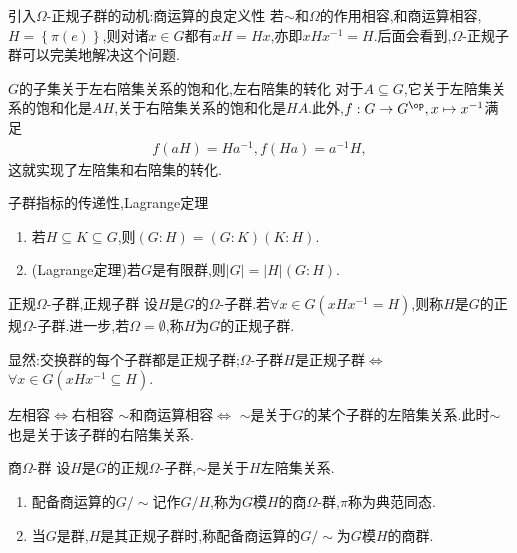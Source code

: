 \begin{remark}{引入$\Omega$-正规子群的动机:商运算的良定义性}{}
	若$\sim$和$\Omega$的作用相容,和商运算相容,$H=\left\{\pi\left(e\right)\right\}$,则对诸$x\in G$都有$xH=Hx$,亦即$xHx^{-1}=H$.后面会看到,$\Omega$-正规子群可以完美地解决这个问题.
\end{remark}

\begin{remark}{$G$的子集关于左右陪集关系的饱和化,左右陪集的转化}{}
	对于$A\subseteq G$,它关于左陪集关系的饱和化是$AH$,关于右陪集关系的饱和化是$HA$.此外,$f:G\to G^{\op},x\mapsto x^{-1}$满足
	\begin{align*}
		f\left(aH\right)=Ha^{-1},f\left(Ha\right)=a^{-1}H,
	\end{align*}
	这就实现了左陪集和右陪集的转化.
\end{remark}

\begin{proposition}{子群指标的传递性,Lagrange定理}{}
	\begin{enumerate}
		\item 若$H\subseteq K\subseteq G$,则$\left(G:H\right)=\left(G:K\right)\left(K:H\right)$.
		\item (Lagrange定理)若$G$是有限群,则$\left|G\right|=\left|H\right|\left(G:H\right)$.
	\end{enumerate}
\end{proposition}

\begin{definition}{正规$\Omega$-子群,正规子群}{}
	设$H$是$G$的$\Omega$-子群.若$\forall x\in G\left(xHx^{-1}=H\right)$,则称$H$是$G$的正规$\Omega$-子群.进一步,若$\Omega=\emptyset$,称$H$为$G$的正规子群.
\end{definition}

显然:交换群的每个子群都是正规子群;$\Omega$-子群$H$是正规子群$\iff$ $\forall x\in G\left(xHx^{-1}\subseteq H\right)$.

\begin{proposition}{左相容$\iff$右相容}{}
	$\sim$和商运算相容$\iff$ $\sim$是关于$G$的某个子群的左陪集关系.此时$\sim$也是关于该子群的右陪集关系.
\end{proposition}

\begin{definition}{商$\Omega$-群}{}
	设$H$是$G$的正规$\Omega$-子群,$\sim$是关于$H$左陪集关系.
	\begin{enumerate}
		\item 配备商运算的$G/\sim$记作$G/H$,称为$G$模$H$的商$\Omega$-群,$\pi$称为典范同态.
		\item 当$G$是群,$H$是其正规子群时,称配备商运算的$G/\sim$为$G$模$H$的商群.
	\end{enumerate}
\end{definition}

